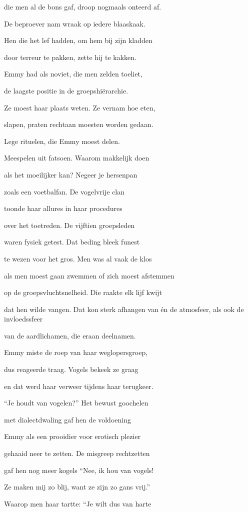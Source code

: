 die men al de bons gaf,
droop nogmaals onteerd af.

De beproever nam wraak
op iedere blaaskaak.

Hen die het lef hadden,
om hem bij zijn kladden

door terreur te pakken,
zette hij te kakken.

Emmy had als noviet,
die men zelden toeliet,

de laagste positie
in de groepshiërarchie.

Ze moest haar plaats weten.
Ze vernam hoe eten,

slapen, praten rechtaan
moesten worden gedaan.

Lege rituelen,
die Emmy moest delen.

Meespelen uit fatsoen. Waarom makkelijk doen

als het moeilijker kan?
Negeer je hersenpan

zoals een voetbalfan.
De vogelvrije clan

toonde haar allures
in haar procedures

over het toetreden.
De vijftien groepsleden

waren fysiek getest.
Dat beding bleek funest

te wezen voor het gros.
Men was al vaak de klos

als men moest gaan zwemmen
of zich moest afstemmen

op de groepsvluchtsnelheid.
Die raakte elk lijf kwijt

dat hen wilde vangen.
Dat kon sterk afhangen
van én de atmosfeer,
als ook de invloedssfeer

van de aardlichamen,
die eraan deelnamen.

Emmy miste de roep
van haar weglopersgroep,

dus reageerde traag.
Vogels bekeek ze graag

en dat werd haar verweer
tijdens haar terugkeer.

“Je houdt van vogelen?”
Het bewust goochelen

met dialectdwaling
gaf hen de voldoening

Emmy als een prooidier
voor erotisch plezier

gehaaid neer te zetten.
De misgreep rechtzetten

gaf hen nog meer kogels
“Nee, ik hou van vogels!

Ze maken mij zo blij,
want ze zijn zo gans vrij.”

Waarop men haar tartte:
“Je wilt dus van harte

